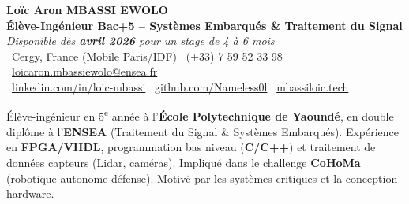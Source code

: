 \documentclass[a4paper,11pt]{article}
\begin{document}
\begin{center}
    {\Large \textbf{Loïc Aron MBASSI EWOLO}} \\ \vspace{4pt}
    \textbf{\large Élève-Ingénieur Bac+5 -- Systèmes Embarqués \& Traitement du Signal} \\
    \textit{\small Disponible dès \textbf{avril 2026} pour un stage de 4 à 6 mois} \\ \vspace{4pt}
    \small
    \faMapMarker\ Cergy, France (Mobile Paris/IDF) \quad
    \faPhone\ (+33) 7 59 52 33 98 \quad
    \faEnvelope\ \href{mailto:loicaron.mbassiewolo@ensea.fr}{loicaron.mbassiewolo@ensea.fr} \\ \vspace{2pt}
    \faLinkedin\ \href{https://www.linkedin.com/in/loic-aron-mbassi-ewolo-3942a9246/}{linkedin.com/in/loic-mbassi} \quad
    \faGithub\ \href{https://github.com/Nameless0l}{github.com/Nameless0l} \quad
    \faGlobe\ \href{https://mbassiloic.tech}{mbassiloic.tech}
\end{center}

\vspace{-6pt}

\noindent\small{Élève-ingénieur en 5\textsuperscript{e} année à l'\textbf{École Polytechnique de Yaoundé}, en double diplôme à l'\textbf{ENSEA} (Traitement du Signal \& Systèmes Embarqués). Expérience en \textbf{FPGA/VHDL}, programmation bas niveau (\textbf{C/C++}) et traitement de données capteurs (Lidar, caméras). Impliqué dans le challenge \textbf{CoHoMa} (robotique autonome défense). Motivé par les systèmes critiques et la conception hardware.}

\end{document}

